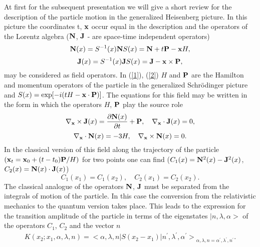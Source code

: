 \documentclass[a4paper,12pt]{article}
\begin{document}
At first for the subsequent presentation we will give a short review for the description of the particle motion   in  the generalized Heisenberg  picture. In this picture   the coordinates t, ${\bf x}$ occur equal in the description and the operators of the Lorentz algebra  (${\bf N}$, ${\bf J}$ - are  space-time independent operators)
\begin{equation}
\label{1}
{\bf N}(x)=S^{-1}(x){\bf N}S(x)={\bf N}+t{\bf P}-{\bf x}{H},
\end{equation} 
\begin{equation}
\label{2}
{\bf J}(x)=S^{-1}(x){\bf J}S(x)={\bf J}-{\bf x}\times{\bf P},
\end{equation}
may be  considered as field  operators. In (\ref{1}), (\ref{2}) ${H}$ and ${\bf P}$ are the  Hamilton and momentum operators of the particle in the generalized Schr\"odinger  picture and $S(x)=\exp[-i(tH-{\bf x}\cdot{\bf P})]$.   The  equations for this field may be written in the form in which the  operators ${H}$,  ${\bf P}$  play the source role 
\begin{equation}
\label{3} 
{\bf \nabla}_{\bf x}\times{\bf J}(x)=\frac{\partial{\bf N}
(x)}{\partial{t}}+{\bf P},\quad{\bf \nabla}_{\bf x}\cdot{\bf J}(x)=0,
\end{equation}
\begin{equation}
\label{4} 
{\bf \nabla}_{\bf x}\cdot{\bf N}(x)=-3H,\quad{\bf \nabla}_{\bf x}\times{\bf N}(x)=0.
\end{equation}
In the classical version of this  field along  the trajectory  of the particle $({\bf x}_t={\bf x}_0+(t-t_0){\bf P}/H)$ for two points  one can find ($C_1(x)={\bf N}^2(x)-{\bf J}^2(x)$, ${C_2}(x)={\bf N}(x)\cdot{\bf J}(x)$)  
\begin{equation}
\label{5} 
{C_1(x_1)}={C_1(x_2)},\quad{C_2}(x_1)={C_2(x_2)}.
\end{equation}
The classical analogue of the operators ${\bf N}$, ${\bf J}$   must be separated from the integrals  of  motion of the particle. In this case the conversion from the  relativistic mechanics to the  quantum version  takes place. This leads  to  the expression for the transition amplitude  of the particle in terms of  the   eigenstates  $|{n},{\lambda},{\alpha}>$ of the operators $C_1$, $C_2$ and the vector ${n}$ 
\begin{eqnarray}
\label{6}
K(x_2;x_1,{\alpha},{\lambda},n)=<{\alpha},{\lambda},{n}|S(x_2-x_1)|{ n}^{'},{\lambda}^{'},{\alpha}^{'}>{_{{\alpha},{\lambda},{ n}={\alpha}^{'},{\lambda}^{'},{ n}^{'}}}.
\end{eqnarray}
\end{document}
